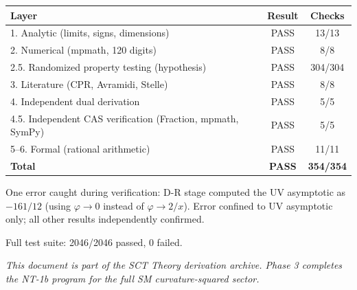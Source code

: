 \documentclass[11pt,a4paper]{article}
\begin{document}
\begin{center}
\renewcommand{\arraystretch}{1.2}
\begin{tabular}{lcc}
  \toprule
  \textbf{Layer} & \textbf{Result} & \textbf{Checks} \\
  \midrule
  1. Analytic (limits, signs, dimensions) & PASS & 13/13 \\
  2. Numerical (mpmath, 120 digits) & PASS & 8/8 \\
  2.5. Randomized property testing (hypothesis) & PASS & 304/304 \\
  3. Literature (CPR, Avramidi, Stelle) & PASS & 8/8 \\
  4. Independent dual derivation & PASS & 5/5 \\
  4.5. Independent CAS verification (Fraction, mpmath, SymPy) & PASS & 5/5 \\
  5--6. Formal (rational arithmetic) & PASS & 11/11 \\
  \midrule
  \textbf{Total} & \textbf{PASS} & \textbf{354/354} \\
  \bottomrule
\end{tabular}
\end{center}

One error caught during verification: D-R stage computed the UV asymptotic
as $-161/12$ (using $\varphi \to 0$ instead of $\varphi \to 2/x$). Error
confined to UV asymptotic only; all other results independently confirmed.

Full test suite: 2046/2046 passed, 0 failed.

\vspace{1em}
\noindent
\textit{This document is part of the SCT Theory derivation archive.
Phase 3 completes the NT-1b program for the full SM curvature-squared sector.}
\end{document}
